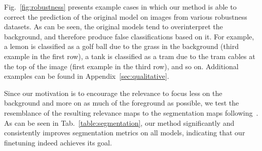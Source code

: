 \documentclass{article}
\begin{document}
Fig.~\ref{fig:robustness} presents example cases in which our method is able to correct the prediction of the original model on images from various robustness datasets. As can be seen, the original models tend to overinterpret the background, and therefore produce false classifications based on it. For example, a lemon is classified as a golf ball due to the grass in the background (third example in the first row), a tank is classified as a tram due to the tram cables at the top of the image (first example in the third row), and so on. Additional examples can be found in Appendix~\ref{sec:qualitative}.


 Since our motivation is to encourage the relevance to focus less on the background and more on as much of the foreground as possible, we test the resemblance of the resulting relevance maps to the segmentation maps following~\cite{chefer2020transformer}. As can be seen in Tab.~\ref{table:segmentation}, our method significantly and consistently improves segmentation metrics on all models, indicating that our finetuning indeed achieves its goal.
\end{document}
